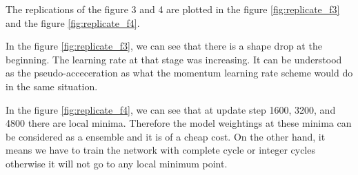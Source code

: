 \documentclass[12pt]{article}
\newenvironment{question}[2][Question]{\begin{trivlist}
\kern10pt
\item[\hskip \labelsep {\bfseries #1}\hskip \labelsep {\bfseries #2.}]}{\end{trivlist}}
\begin{document}
\begin{question}{ii}

The replications of the figure 3 and 4 are plotted in the figure \ref{fig:replicate_f3}
and the figure \ref{fig:replicate_f4}.

In the figure \ref{fig:replicate_f3}, we can see that there is a shape drop at
the beginning. The learning rate at that stage was increasing.
It can be understood as the pseudo-acceceration as what the momentum learning rate
scheme would do in the same situation.

In the figure \ref{fig:replicate_f4}, we can see that at update step 1600, 3200,
and 4800 there are local minima. Therefore the model weightings at these minima
can be considered as a ensemble and it is of a cheap cost.
On the other hand, it means we have to
train the network with complete cycle or integer cycles otherwise it will not go to any local
minimum point.


\end{question}
\end{document}
